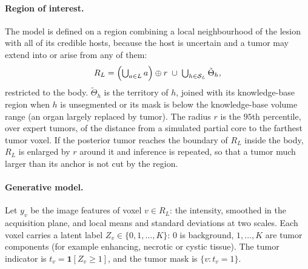 \documentclass[fleqn,10pt]{olplainarticle}
\begin{document}
\paragraph{Region of interest.} The model is defined on a region combining a local neighbourhood of the lesion with all of
its credible hosts, because the host is uncertain and a tumor may extend into or arise from any of them:
\begin{equation}
\label{eq:roi}
R_L=\Bigl(\textstyle\bigcup_{a\in L}a\Bigr)\oplus r\;\cup\;\bigcup_{h\in\mathcal{S}_L}\tilde\Theta_h ,
\end{equation}
restricted to the body. $\tilde\Theta_h$ is the territory of $h$, joined with its knowledge-base region when $h$ is
unsegmented or its mask is below the knowledge-base volume range (an organ largely replaced by tumor). The radius $r$ is the
$95$th percentile, over expert tumors, of the distance from a simulated partial core to the farthest tumor voxel. If the
posterior tumor reaches the boundary of $R_L$ inside the body, $R_L$ is enlarged by $r$ around it and inference is
repeated, so that a tumor much larger than its anchor is not cut by the region.

\paragraph{Generative model.} Let $y_v$ be the image features of voxel $v\in R_L$: the intensity, smoothed in the
acquisition plane, and local means and standard deviations at two scales. Each voxel carries a latent label
$Z_v\in\{0,1,\dots,K\}$: $0$ is background, $1,\dots,K$ are tumor components (for example enhancing, necrotic or cystic
tissue). The tumor indicator is $t_v=\mathbf{1}[Z_v\ge1]$, and the tumor mask is $\{v:t_v=1\}$.
\end{document}
